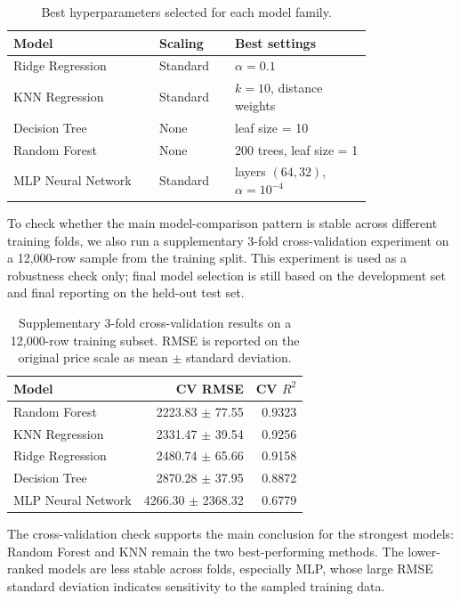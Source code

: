 \begin{table}[h]
\centering
\scriptsize
\setlength{\tabcolsep}{3pt}
\begin{tabular}{@{}p{0.33\linewidth}p{0.16\linewidth}p{0.31\linewidth}@{}}
\toprule
\textbf{Model} & \textbf{Scaling} & \textbf{Best settings} \\
\midrule
Ridge Regression & Standard & $\alpha=0.1$ \\
KNN Regression & Standard & $k=10$, distance weights \\
Decision Tree & None & leaf size = 10 \\
Random Forest & None & 200 trees, leaf size = 1 \\
MLP Neural Network & Standard & layers $(64,32)$, $\alpha=10^{-4}$ \\
\bottomrule
\end{tabular}
\caption{Best hyperparameters selected for each model family.}
\label{tab:best_hyperparameters}
\end{table}

To check whether the main model-comparison pattern is stable across different training folds, we also run a supplementary 3-fold cross-validation experiment on a 12{,}000-row sample from the training split. This experiment is used as a robustness check only; final model selection is still based on the development set and final reporting on the held-out test set.

\begin{table}[h]
\centering
\small
\setlength{\tabcolsep}{3pt}
\begin{tabular}{@{}lrr@{}}
\toprule
\textbf{Model} & \textbf{CV RMSE} & \textbf{CV $R^2$} \\
\midrule
Random Forest      & 2223.83 $\pm$ 77.55 & 0.9323 \\
KNN Regression     & 2331.47 $\pm$ 39.54 & 0.9256 \\
Ridge Regression   & 2480.74 $\pm$ 65.66 & 0.9158 \\
Decision Tree      & 2870.28 $\pm$ 37.95 & 0.8872 \\
MLP Neural Network & 4266.30 $\pm$ 2368.32 & 0.6779 \\
\bottomrule
\end{tabular}
\caption{Supplementary 3-fold cross-validation results on a 12{,}000-row training subset. RMSE is reported on the original price scale as mean $\pm$ standard deviation.}
\label{tab:cross_validation_results}
\end{table}

The cross-validation check supports the main conclusion for the strongest models: Random Forest and KNN remain the two best-performing methods. The lower-ranked models are less stable across folds, especially MLP, whose large RMSE standard deviation indicates sensitivity to the sampled training data.

